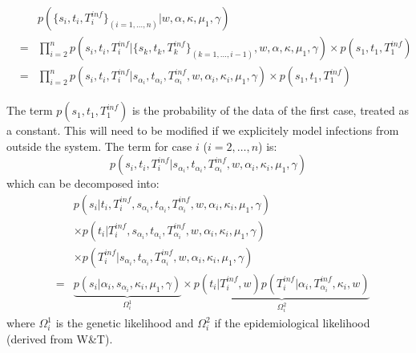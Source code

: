 \documentclass[10pt]{article}
\begin{document}
\begin{eqnarray}
& & p(\{s_i, t_i, T_i^{inf}\}_{(i=1,\ldots,n)}|  w,  \alpha, \kappa, \mu_1, \gamma) \\
& = & \prod_{i=2}^n p(s_i, t_i, T_i^{inf} | \{s_k, t_k, T_k^{inf} \}_{(k=1,\ldots,i-1)}, w,  \alpha, \kappa, \mu_1, \gamma) 
  \times p(s_1, t_1, T_1^{inf})\\
& = & \prod_{i=2}^n p(s_i, t_i, T_i^{inf}| s_{\alpha_i}, t_{\alpha_i}, T_{\alpha_i}^{inf},  w,  \alpha_i, \kappa_i, \mu_1, \gamma) 
  \times p(s_1, t_1, T_1^{inf})
\end{eqnarray}


The term $p(s_1, t_1, T_1^{inf})$ is the probability of the data of the first case, treated as a constant.
This will need to be modified if we explicitely model infections from outside the system.
The term for case $i$ ($i=2,\ldots,n$) is:
\begin{equation}
 p(s_i, t_i, T_i^{inf}| s_{\alpha_i}, t_{\alpha_i}, T_{\alpha_i}^{inf},  w,  \alpha_i, \kappa_i, \mu_1, \gamma )
\end{equation}
which can be decomposed into:
\begin{eqnarray}
& & p(s_i | t_i, T_i^{inf}, s_{\alpha_i}, t_{\alpha_i}, T_{\alpha_i}^{inf},  w,  \alpha_i, \kappa_i, \mu_1, \gamma) \nonumber \\
& &  \times  p(t_i | T_i^{inf}, s_{\alpha_i}, t_{\alpha_i}, T_{\alpha_i}^{inf},  w,  \alpha_i, \kappa_i, \mu_1, \gamma) \nonumber \\
& & \times  p(T_i^{inf}| s_{\alpha_i}, t_{\alpha_i}, T_{\alpha_i}^{inf},  w,  \alpha_i, \kappa_i, \mu_1, \gamma) \nonumber \\
& = & 
\underbrace{p(s_i | \alpha_i, s_{\alpha_i}, \kappa_i, \mu_1, \gamma)}_{\Omega_i^1} 
  \times  \underbrace{p(t_i | T_i^{inf}, w) 
  p(T_i^{inf}| \alpha_i, T_{\alpha_i}^{inf}, \kappa_i, w)}_{\Omega_i^2}
\end{eqnarray}
\noindent where $\Omega_i^1$ is the genetic likelihood and $\Omega_i^2$ if the epidemiological likelihood (derived from W\&T).
\\
\end{document}
